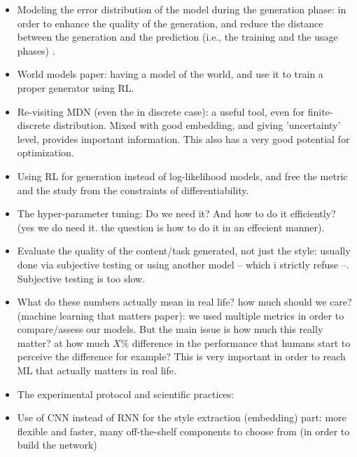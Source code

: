 \begin{itemize}[noitemsep]
    \item Modeling the error distribution of the model during the generation phase: in order to enhance the quality of the generation, and reduce the distance between the generation and the prediction (i.e., the training and the usage phases) .

    \item World models paper: having a model of the world, and use it to train a proper generator using RL.

    \item Re-visiting MDN (even the in discrete case): a useful tool, even for finite-discrete distribution. Mixed with good embedding, and giving 'uncertainty' level, provides important information. This also has a very good potential for optimization.

    \item Using RL for generation instead of log-likelihood models, and free the metric and the study from the constraints of differentiability.
    \item The hyper-parameter tuning: Do we need it? And how to do it efficiently? (yes we do need it. the question is how to do it in an effecient manner).

    \item Evaluate the quality of the content/task generated, not just the style: usually done via subjective testing or using another model -- which i strictly refuse --. Subjective testing is too slow.

    \item What do these numbers actually mean in real life? how much should we care? \cite{wagstaff2012machine} (machine learning that matters paper): we used multiple metrics in order to compare/assess our models. But the main issue is how much this really matter? at how much $X\%$ difference in the performance that humans start to perceive the difference for example? This is very important in order to reach ML that actually matters in real life.

    \item The experimental protocol and scientific practices:

    \item Use of CNN instead of RNN for the style extraction (embedding) part: more flexible and faster, many off-the-shelf components to choose from (in order to build the network)
\end{itemize}
